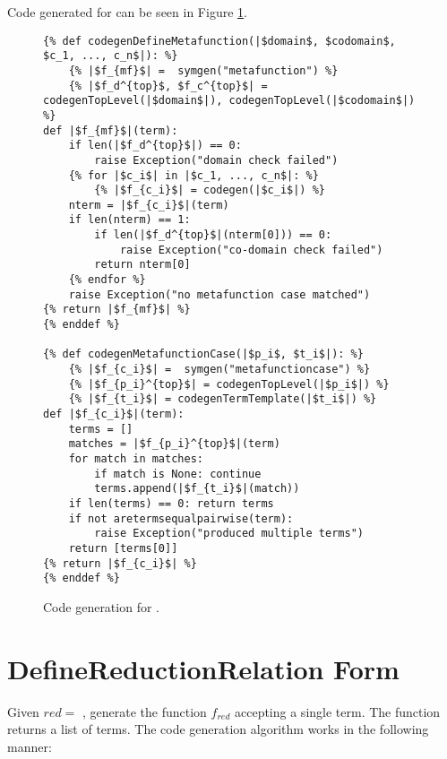 Code generated for \DefineMetafunctionNoArgs \space can be seen in Figure \ref{codegen-define-metafunc}.
\begin{figure}
\begin{verbatim}
{% def codegenDefineMetafunction(|$domain$, $codomain$, $c_1, ..., c_n$|): %}
	{% |$f_{mf}$| =  symgen("metafunction") %}
	{% |$f_d^{top}$, $f_c^{top}$| = codegenTopLevel(|$domain$|), codegenTopLevel(|$codomain$|) %}
def |$f_{mf}$|(term):
	if len(|$f_d^{top}$|) == 0:
		raise Exception("domain check failed")
	{% for |$c_i$| in |$c_1, ..., c_n$|: %}
		{% |$f_{c_i}$| = codegen(|$c_i$|) %}
	nterm = |$f_{c_i}$|(term)
	if len(nterm) == 1:
		if len(|$f_d^{top}$|(nterm[0])) == 0:
			raise Exception("co-domain check failed")
		return nterm[0]
	{% endfor %}
	raise Exception("no metafunction case matched")
{% return |$f_{mf}$| %}
{% enddef %}

{% def codegenMetafunctionCase(|$p_i$, $t_i$|): %}
	{% |$f_{c_i}$| =  symgen("metafunctioncase") %}
	{% |$f_{p_i}^{top}$| = codegenTopLevel(|$p_i$|) %}
	{% |$f_{t_i}$| = codegenTermTemplate(|$t_i$|) %}
def |$f_{c_i}$|(term):
	terms = []
	matches = |$f_{p_i}^{top}$|(term)
	for match in matches:
		if match is None: continue
		terms.append(|$f_{t_i}$|(match))
	if len(terms) == 0: return terms
	if not aretermsequalpairwise(term):
		raise Exception("produced multiple terms")
	return [terms[0]]
{% return |$f_{c_i}$| %}
{% enddef %}
\end{verbatim}
\caption{Code generation for \DefineMetafunctionNoArgs.}
\label{codegen-define-metafunc}
\end{figure}

\section{DefineReductionRelation Form}
Given $red=$ \TlDefineReductionRelation, generate the function $f_{red}$ accepting a single term. The function returns a list of terms. The code generation algorithm works in the following manner:

